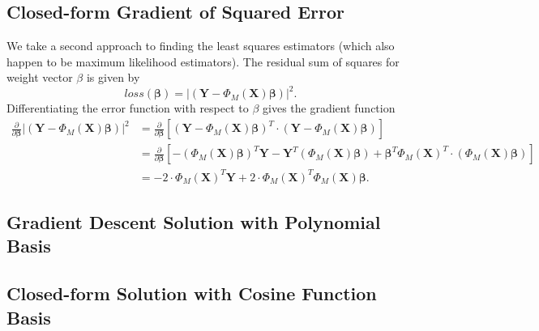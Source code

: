 \documentclass{article}
\begin{document}
\subsection{Closed-form Gradient of Squared Error}
We take a second approach to finding the least squares estimators (which also happen to be maximum likelihood estimators). The residual sum of squares for weight vector $\beta$ is given by
\[
loss(\bm \beta) = |(\bm Y - \Phi_M(\bm X) \bm \beta)|^2.
\]
Differentiating the error function with respect to $\beta$ gives the gradient function
%
 \begin{align*}
   \frac{\partial }{\partial \bm \beta} |(\bm Y - \Phi_M(\bm X) \bm \beta)|^2 &= \frac{\partial }{\partial \bm \beta} [(\bm Y - \Phi_M(\bm X) \bm \beta)^T \cdot (\bm Y - \Phi_M(\bm X) \bm \beta)] \\
   &= \frac{\partial }{\partial \bm \beta} [- (\Phi_M(\bm X) \bm \beta)^T \bm Y - \bm Y^T (\Phi_M(\bm X) \bm \beta) + \bm \beta^T \Phi_M(\bm X)^T \cdot (\Phi_M(\bm X) \bm \beta)] \\
   &= -2  \cdot \Phi_M(\bm X)^T \bm Y + 2 \cdot \Phi_M(\bm X)^T \Phi_M(\bm X) \bm \beta.
 \end{align*}
%

\subsection{Gradient Descent Solution with Polynomial Basis}

\subsection{Closed-form Solution with Cosine Function Basis}

\end{document}
